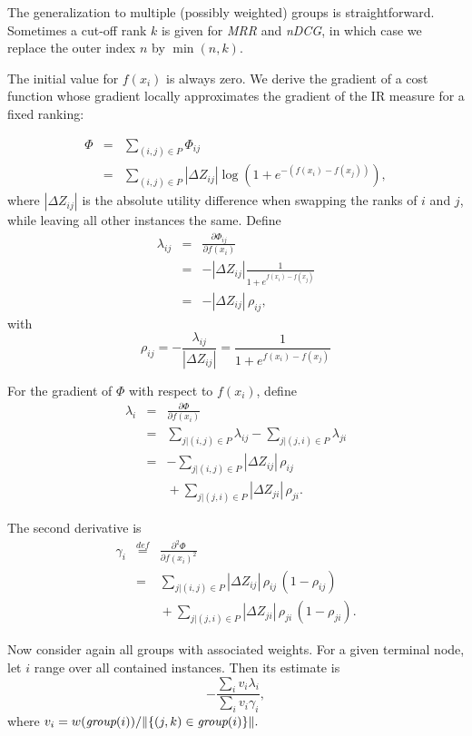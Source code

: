 \documentclass{article}
\begin{document}
The generalization to multiple (possibly weighted) groups is
straightforward. Sometimes a cut-off rank $k$ is given for \emph{MRR}
and \emph{nDCG}, in which case we replace the outer index $n$ by
$\min(n,k)$.

The initial value for $f(x_i)$ is always zero. We derive the gradient of
a cost function whose gradient locally approximates the gradient of
the IR measure for a fixed ranking:

\begin{eqnarray*}
\Phi & = & \sum_{(i,j) \in P} \Phi_{ij}\\
 & = & \sum_{(i,j) \in P} |\Delta Z_{ij}| \log \left( 1 + e^{-(f(x_i) -
    f(x_j))}\right),
\end{eqnarray*}
where $|\Delta Z_{ij}|$ is the absolute utility difference when
swapping the ranks of $i$ and $j$, while leaving all other instances
the same. Define
\begin{eqnarray*}
  \lambda_{ij} & = & \frac{\partial\Phi_{ij}}{\partial f(x_i)}\\
  & = & - |\Delta Z_{ij}| \frac{1}{1 + e^{f(x_i) - f(x_j)}}\\
&   = & - |\Delta Z_{ij}| \, \rho_{ij},
\end{eqnarray*}
with
$$   \rho_{ij} = - \frac{\lambda_{ij }}{|\Delta Z_{ij}|} = \frac{1}{1 + e^{f(x_i) - f(x_j)}}$$

 For the gradient of $\Phi$ with respect to $f(x_i)$, define
\begin{eqnarray*}
\lambda_i & = & \frac{\partial \Phi}{\partial f(x_i)}\\
& = &  \sum_{j|(i,j) \in P} \lambda_{ij} - \sum_{j|(j,i) \in P} \lambda_{ji}\\
& = &   - \sum_{j|(i,j) \in P} |\Delta Z_{ij}| \, \rho_{ij}\\
&  & \mbox{}  + \sum_{j|(j,i) \in P} |\Delta Z_{ji}| \, \rho_{ji}.
\end{eqnarray*}

 The second derivative is
\begin{eqnarray*}
   \gamma_i &  \stackrel{def}{=} &  \frac{\partial^2\Phi}{\partial f(x_i)^2}\\
    & = &  \sum_{j|(i,j) \in P} |\Delta Z_{ij}| \, \rho_{ij} \, (1-\rho_{ij})\\
&  &  \mbox{} + \sum_{j|(j,i) \in P} |\Delta Z_{ji}| \, \rho_{ji} \, (1-\rho_{ji}).
\end{eqnarray*}

Now consider again all groups with associated weights. For a given terminal node, let $i$
range over all contained instances. Then its estimate is
$$-\frac{\sum_i v_i\lambda_{i}}{\sum_i v_i \gamma_i},$$ where
$v_i=w(\mbox{\em group}(i))/\|\{(j,k)\in\mbox{\em group}(i)\}\|.$
\end{document}
